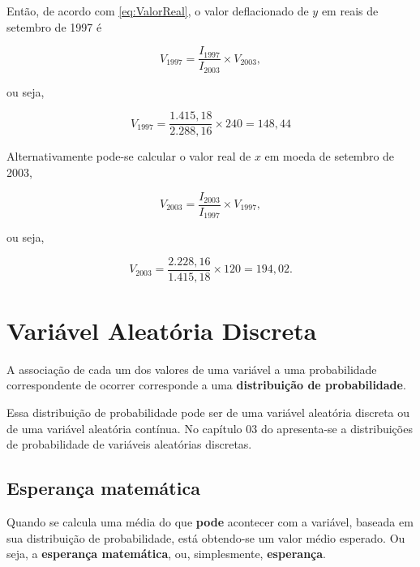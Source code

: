 \documentclass[
]{book}
\begin{document}
Então, de acordo com \eqref{eq:ValorReal}, o valor deflacionado de \(y\) em reais de
setembro de 1997 é

\begin{equation}
  V_{1997} = \frac{I_{1997}}{I_{2003}} \times V_{2003},
\end{equation}

ou seja,

\begin{equation}
  V_{1997} = \frac{1.415,18}{2.288,16} \times 240 = 148,44
\end{equation}

Alternativamente pode-se calcular o valor real de \(x\) em moeda de setembro de 2003,

\begin{equation}
  V_{2003} = \frac{I_{2003}}{I_{1997}} \times V_{1997},
\end{equation}

ou seja,

\begin{equation}
  V_{2003} = \frac{2.228,16}{1.415,18} \times 120 = 194,02.
\end{equation}

\hypertarget{variuxe1vel-aleatuxf3ria-discreta}{%
\chapter{Variável Aleatória Discreta}\label{variuxe1vel-aleatuxf3ria-discreta}}

A associação de cada um dos valores de uma variável a uma probabilidade
correspondente de ocorrer corresponde a uma \textbf{distribuição de
probabilidade}.

Essa distribuição de probabilidade pode ser de uma variável aleatória discreta
ou de uma variável aleatória contínua. No capítulo 03 do \citet{Sartoris2013} apresenta-se
a distribuições de probabilidade de variáveis aleatórias discretas.

\hypertarget{esperanuxe7a-matemuxe1tica}{%
\section{Esperança matemática}\label{esperanuxe7a-matemuxe1tica}}

Quando se calcula uma média do que \textbf{pode} acontecer com a variável,
baseada em sua distribuição de probabilidade, está obtendo-se um valor médio esperado.
Ou seja, a \textbf{esperança matemática}, ou, simplesmente, \textbf{esperança}.
\end{document}
